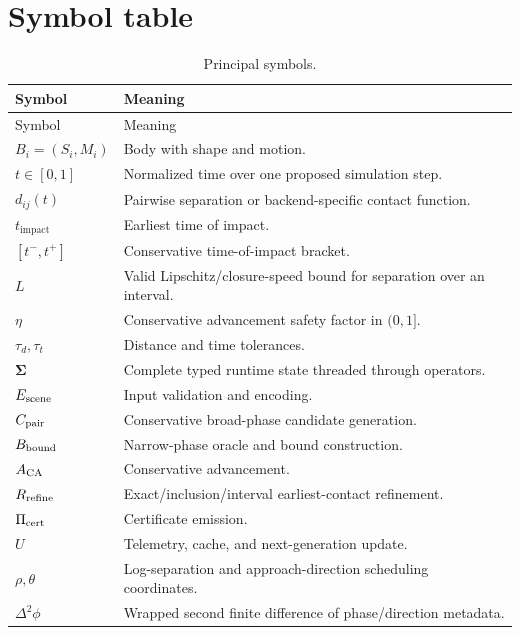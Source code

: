 \documentclass[11pt,a4paper,openany]{book}
\newcommand{\sepfn}{d_{ij}}
\newcommand{\TOI}{t_{\mathrm{impact}}}
\newcommand{\SigmaState}{\boldsymbol{\Sigma}}
\begin{document}
\chapter{Symbol table}
\begin{longtable}{@{}L{0.22\textwidth}L{0.68\textwidth}@{}}
\caption{Principal symbols.}\\
\toprule Symbol & Meaning \\ \midrule
\endfirsthead
\toprule Symbol & Meaning \\ \midrule
\endhead
$B_i=(S_i,M_i)$ & Body with shape and motion. \\
$t\in[0,1]$ & Normalized time over one proposed simulation step. \\
$\sepfn(t)$ & Pairwise separation or backend-specific contact function. \\
$\TOI$ & Earliest time of impact. \\
$[t^-,t^+]$ & Conservative time-of-impact bracket. \\
$L$ & Valid Lipschitz/closure-speed bound for separation over an interval. \\
$\eta$ & Conservative advancement safety factor in $(0,1]$. \\
$\tau_d,\tau_t$ & Distance and time tolerances. \\
$\SigmaState$ & Complete typed runtime state threaded through operators. \\
$E_{\rm scene}$ & Input validation and encoding. \\
$C_{\rm pair}$ & Conservative broad-phase candidate generation. \\
$B_{\rm bound}$ & Narrow-phase oracle and bound construction. \\
$A_{\rm CA}$ & Conservative advancement. \\
$R_{\rm refine}$ & Exact/inclusion/interval earliest-contact refinement. \\
$\Pi_{\rm cert}$ & Certificate emission. \\
$U$ & Telemetry, cache, and next-generation update. \\
$\rho,\theta$ & Log-separation and approach-direction scheduling coordinates. \\
$\Delta^2\phi$ & Wrapped second finite difference of phase/direction metadata. \\
\bottomrule
\end{longtable}
\end{document}
